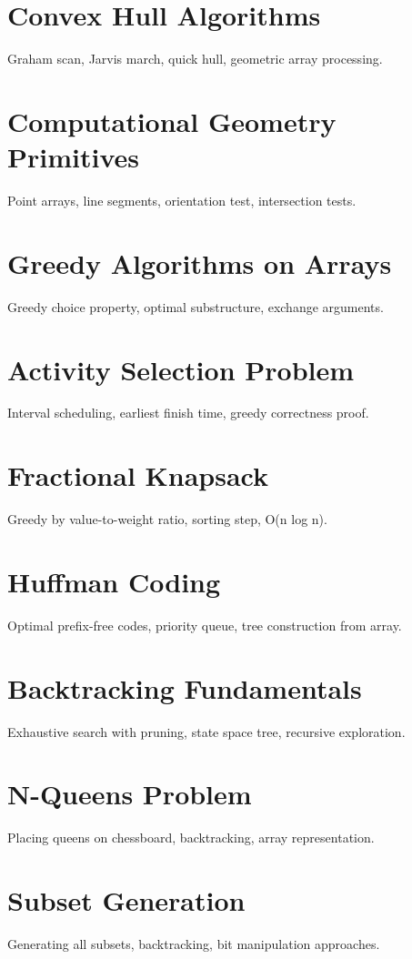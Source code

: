 \chapter{Convex Hull Algorithms}
Graham scan, Jarvis march, quick hull, geometric array processing.

\chapter{Computational Geometry Primitives}
Point arrays, line segments, orientation test, intersection tests.

\chapter{Greedy Algorithms on Arrays}
Greedy choice property, optimal substructure, exchange arguments.

\chapter{Activity Selection Problem}
Interval scheduling, earliest finish time, greedy correctness proof.

\chapter{Fractional Knapsack}
Greedy by value-to-weight ratio, sorting step, O(n log n).

\chapter{Huffman Coding}
Optimal prefix-free codes, priority queue, tree construction from array.

\chapter{Backtracking Fundamentals}
Exhaustive search with pruning, state space tree, recursive exploration.

\chapter{N-Queens Problem}
Placing queens on chessboard, backtracking, array representation.

\chapter{Subset Generation}
Generating all subsets, backtracking, bit manipulation approaches.

